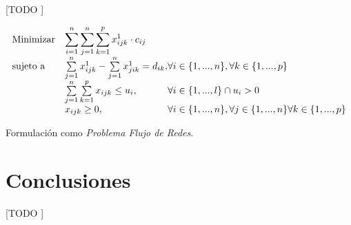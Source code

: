 \documentclass{article}
\begin{document}
    \paragraph{}
    [TODO ]


    \begin{eqfloat}
      \begin{equation}
        \begin{array}{ll@{}ll}
          \text{Minimizar}	& \displaystyle \sum\limits_{i=1}^{n}\sum\limits_{j=1}^{n}\sum\limits_{k=1}^{p} x^{1}_{ijk} \cdot c_{ij} \\
          \text{sujeto a}		& \sum\limits_{j=1}^{n} x^{1}_{ijk} - \sum\limits_{j=1}^{n} x^{1}_{jik} = d_{ik}, & \forall i \in \{1,...,n\}, \forall k \in \{1,...,p\}\\
                            &	\sum\limits_{j=1}^{n}\sum\limits_{k=1}^{p}  x_{ijk}	\leq u_{i}, 		  & \forall i \in \{1,...,l\} \cap u_{i} > 0\\
                            & x_{ijk}	\geq 0, 	& \forall i \in \{1,...,n\}, \forall j \in \{1,...,n\}\forall k \in \{1,...,p\}
        \end{array}
      \end{equation}
      \caption{Formulación como \emph{Problema Flujo de Redes}.}
      \label{eq:linear-programming-model}
    \end{eqfloat}


  \section{Conclusiones}

    \paragraph{}
    [TODO ]
\end{document}

